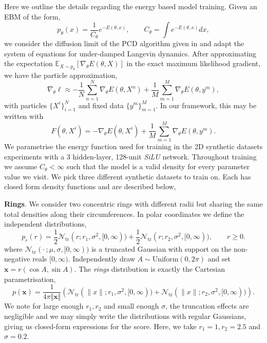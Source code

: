 Here we outline the details regarding the energy based model training. Given an EBM of the form,
\begin{equation}
    p_\theta(x)=\frac{1}{C_\theta}e^{-E(\theta,x)},\qquad C_\theta=\int e^{-E(\theta,x)}dx,
\end{equation}
we consider the diffusion limit of the PCD algorithm given in \cite{oliva2025uniformintimeconvergenceboundspersistent} and adapt the system of equations for under-damped Langevin dynamics. After approximating the expectation $\mathbb{E}_{X\sim p_\theta}[\nabla_\theta E(\theta,X)]$ in the exact maximum likelihood gradient, we have the particle approximation,
\begin{equation*}
    \nabla_\theta\ell\approx-\frac{1}{N}\sum_{n=1}^N\nabla_\theta E(\theta,X^n)+\frac{1}{M}\sum_{m=1}^M\nabla_\theta E(\theta, y^m),
\end{equation*}
with particles $\{X^i\}_{i=1}^N$ and fixed data $\{y^m\}_{m=1}^M$. In our framework, this may be written with
\begin{equation*}
    F(\theta,X^{i})=-\nabla_\theta E(\theta,X^i)+\frac{1}{M}\sum_{m=1}^M\nabla_\theta E(\theta, y^m).
\end{equation*}
We parametrise the energy function used for training in the 2D synthetic datasets experiments with a 3 hidden-layer, 128-unit \textit{SiLU} network. Throughout training we assume $C_\theta<\infty$ such that the model is a valid density for every parameter value we visit. We pick three different synthetic datasets to train on. Each has closed form density functions and are described below,

\textbf{Rings}. We consider two concentric rings with different radii but sharing the same total densities along their circumferences. In polar coordinates we define the independent distributions,
\begin{equation*}
    p_r(r)=\frac{1}{2}\mathcal{N}_{\mathrm{tr}}(r;r_1,\sigma^2,[0,\infty))+\frac{1}{2}\mathcal{N}_{\mathrm{tr}}(r;r_2,\sigma^2,[0,\infty)),\qquad r\ge 0.
\end{equation*}
where $\mathcal{N}_{\mathrm{tr}}(\cdot\,;\mu,\sigma,[0,\infty))$ is a truncated Gaussian with support on the non-negative reals $[0,\infty)$. Independently draw $A\sim\textrm{Uniform}(0,2\pi)$ and set $\mathbf{x}=r(\cos A,\sin A)$. The \textit{rings} distribution is exactly the Cartesian parametrisation,
\begin{equation*}
    p(\mathbf{x})=\frac{1}{4\pi\Vert\mathbf{x}\Vert}\left(\mathcal{N}_{\mathrm{tr}}(\|x\|;r_1,\sigma^2,[0,\infty))+\mathcal{N}_{\mathrm{tr}}(\|x\|;r_2,\sigma^2,[0,\infty))\right).
\end{equation*}
We note for large enough $r_1,r_2$ and small enough $\sigma$, the truncation effects are negligible and we may simply write the distributions with regular Gaussians, giving us closed-form expressions for the score. Here, we take $r_1=1,r_2=2.5$ and $\sigma=0.2$.

